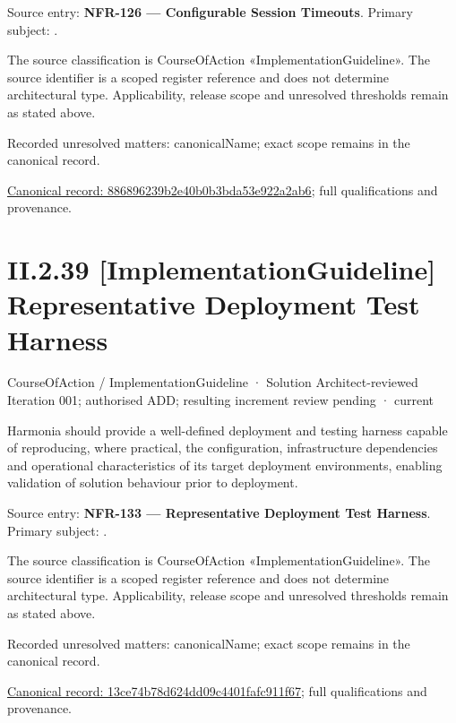 Source entry: \textbf{NFR-126 — Configurable Session Timeouts}. Primary subject: \texttt{}.



The source classification is CourseOfAction «ImplementationGuideline». The source identifier is a scoped register reference and does not determine architectural type. Applicability, release scope and unresolved thresholds remain as stated above.


{\small Recorded unresolved matters: canonicalName; exact scope remains in the canonical record.}\par
{\footnotesize \href{../../../../continuum/strategy/course-of-action/implementation-guideline/886896239b2e40b0b3bda53e922a2ab6.md}{Canonical record: 886896239b2e40b0b3bda53e922a2ab6}; full qualifications and provenance.}\par
\section*{II.2.39 [ImplementationGuideline] Representative Deployment Test Harness}
\label{navigation:II.2.39}

\label{element:13ce74b78d624dd09c4401fafc911f67}
{\small CourseOfAction / ImplementationGuideline · Solution Architect-reviewed Iteration 001; authorised ADD; resulting increment review pending · current}\par

Harmonia should provide a well-defined deployment and testing harness capable of reproducing, where practical, the configuration, infrastructure dependencies and operational characteristics of its target deployment environments, enabling validation of solution behaviour prior to deployment.



Source entry: \textbf{NFR-133 — Representative Deployment Test Harness}. Primary subject: \texttt{}.



The source classification is CourseOfAction «ImplementationGuideline». The source identifier is a scoped register reference and does not determine architectural type. Applicability, release scope and unresolved thresholds remain as stated above.


{\small Recorded unresolved matters: canonicalName; exact scope remains in the canonical record.}\par
{\footnotesize \href{../../../../continuum/strategy/course-of-action/implementation-guideline/13ce74b78d624dd09c4401fafc911f67.md}{Canonical record: 13ce74b78d624dd09c4401fafc911f67}; full qualifications and provenance.}\par
